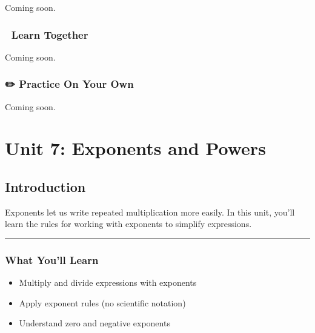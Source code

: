 \documentclass[
  letterpaper,
  DIV=11,
  numbers=noendperiod]{scrreprt}
\providecommand{\tightlist}{%
  \setlength{\itemsep}{0pt}\setlength{\parskip}{0pt}}
\begin{document}

Coming soon.

\section*{🧠 Learn Together}\label{learn-together-34}


Coming soon.

\section*{✏️ Practice On Your Own}\label{practice-on-your-own-34}


Coming soon.

\part{Unit 7: Exponents and Powers}

\chapter*{Introduction}\label{introduction-6}


Exponents let us write repeated multiplication more easily. In this
unit, you'll learn the rules for working with exponents to simplify
expressions.

\begin{center}\rule{0.5\linewidth}{0.5pt}\end{center}

\section*{What You'll Learn}\label{what-youll-learn-6}


\begin{itemize}
\tightlist
\item
  Multiply and divide expressions with exponents
\item
  Apply exponent rules (no scientific notation)
\item
  Understand zero and negative exponents
\end{itemize}
\end{document}
